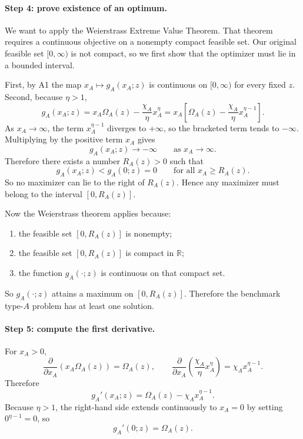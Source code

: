 \paragraph{Step 4: prove existence of an optimum.}
We want to apply the Weierstrass Extreme Value Theorem. That theorem requires a continuous objective on a nonempty compact feasible set. Our original feasible set $[0,\infty)$ is not compact, so we first show that the optimizer must lie in a bounded interval.

First, by A1 the map $x_A\mapsto g_A(x_A;z)$ is continuous on $[0,\infty)$ for every fixed $z$. Second, because $\eta>1$,
\[
g_A(x_A;z)
=
x_A\Omega_A(z)-\frac{\chi_A}{\eta}x_A^\eta
=
x_A\left[\Omega_A(z)-\frac{\chi_A}{\eta}x_A^{\eta-1}\right].
\]
As $x_A\to\infty$, the term $x_A^{\eta-1}$ diverges to $+\infty$, so the bracketed term tends to $-\infty$. Multiplying by the positive term $x_A$ gives
\[
g_A(x_A;z)\to -\infty
\qquad\text{as }x_A\to\infty.
\]
Therefore there exists a number $R_A(z)>0$ such that
\[
g_A(x_A;z)<g_A(0;z)=0
\qquad\text{for all }x_A\ge R_A(z).
\]
So no maximizer can lie to the right of $R_A(z)$. Hence any maximizer must belong to the interval $[0,R_A(z)]$.

Now the Weierstrass theorem applies because:
\begin{enumerate}
    \item the feasible set $[0,R_A(z)]$ is nonempty;
    \item the feasible set $[0,R_A(z)]$ is compact in $\mathbb R$;
    \item the function $g_A(\cdot;z)$ is continuous on that compact set.
\end{enumerate}
So $g_A(\cdot;z)$ attains a maximum on $[0,R_A(z)]$. Therefore the benchmark type-$A$ problem has at least one solution.

\paragraph{Step 5: compute the first derivative.}
For $x_A>0$,
\[
\frac{\partial}{\partial x_A}\left(x_A\Omega_A(z)\right)=\Omega_A(z),
\qquad
\frac{\partial}{\partial x_A}\left(\frac{\chi_A}{\eta}x_A^\eta\right)=\chi_A x_A^{\eta-1}.
\]
Therefore
\begin{equation}
g_A'(x_A;z)=\Omega_A(z)-\chi_A x_A^{\eta-1}.
\label{eq:p2A_derivative_rev}
\end{equation}
Because $\eta>1$, the right-hand side extends continuously to $x_A=0$ by setting $0^{\eta-1}=0$, so
\[
g_A'(0;z)=\Omega_A(z).
\]

